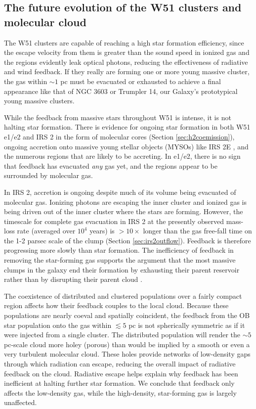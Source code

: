 \subsection{The future evolution of the W51 clusters and molecular cloud}
The W51 clusters are capable of reaching a high star formation efficiency,
since the escape velocity from them is greater than the sound speed in ionized gas
\citep{Matzner2002a,Ginsburg2012a,Bressert2012a,Dale2014a} and
the \hii regions evidently leak optical photons, reducing the effectiveness of
radiative and wind feedback.  If they really are
forming one or more
young massive cluster, the gas within $\sim 1$ pc must be evacuated or
exhausted to achieve a final appearance like that of NGC 3603 or Trumpler 14,
our Galaxy's prototypical young massive clusters.


While the feedback from massive stars throughout W51 is intense, it is not
halting star formation.  There is evidence for ongoing star formation in both
W51 e1/e2 and IRS 2 in the form of molecular cores (Section
\ref{sec:h2coemission}), ongoing accretion onto massive young stellar objects
(MYSOs) like IRS 2E \citep{Figueredo2008a}, and the numerous \hchii regions
that are likely to be accreting.  In e1/e2, there is no sign that feedback
has evacuated \emph{any} gas yet, and the \hii regions appear to be surrounded
by molecular gas.

In IRS 2, accretion is ongoing despite much of its volume being evacuated of
molecular gas.
Ionizing photons are escaping the inner cluster and ionized gas is being driven
out of the inner cluster where the stars are forming.  However, the timescale
for complete gas evacuation in IRS 2 at the presently observed mass-loss rate
(averaged over $10^4$ years) is ${>}10\times$ longer than the gas free-fall time
on the 1-2 parsec scale of the clump 
(Section \ref{sec:irs2outflow}).
Feedback is therefore progressing more slowly
than star formation.
The inefficiency of feedback in removing the star-forming
gas supports the argument that the most massive clumps in
the galaxy  end their formation by exhausting their parent reservoir rather
than by disrupting their parent cloud \citep{Kruijssen2012b,Matzner2015a}.

The coexistence of distributed and clustered populations over a fairly compact
region affects how their feedback couples to the local cloud.  Because these
populations are nearly coeval and spatially coincident, the feedback from the
OB star population onto the gas within $\lesssim5$ pc is not spherically symmetric as
if it were injected from a single cluster.  The distributed population will
render the $\sim5$ pc-scale cloud more holey (porous) than would be
implied by a smooth or even a very turbulent molecular cloud.  These holes
provide networks of low-density gaps through which radiation can escape,
reducing the overall impact of radiative feedback on the cloud.  Radiative
escape helps explain why feedback has been inefficient at halting further star
formation.  We conclude that feedback only affects the low-density gas, while
the high-density, star-forming gas is largely unaffected.

